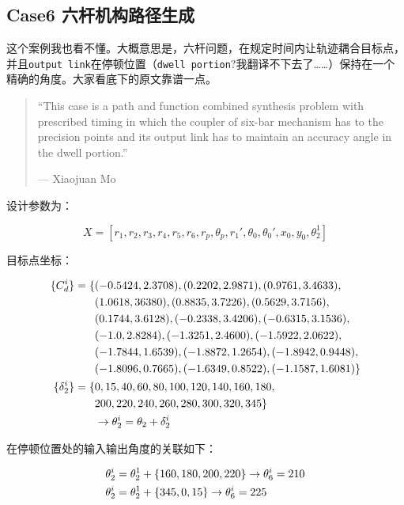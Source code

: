 \documentclass[]{ctexbook}
\theoremstyle{definition}
\theoremstyle{definition}
\theoremstyle{definition}
\theoremstyle{remark}
\begin{document}
\subsection{Case6 六杆机构路径生成}\label{case6-}

这个案例我也看不懂。大概意思是，六杆问题，在规定时间内让轨迹耦合目标点，并且\texttt{output\ link}在停顿位置（\texttt{dwell\ portion}?我翻译不下去了\ldots{}\ldots{}）保持在一个精确的角度。大家看底下的原文靠谱一点。

\begin{quote}
``This case is a path and function combined synthesis problem with
prescribed timing in which the coupler of six-bar mechanism has to the
precision points and its output link has to maintain an accuracy angle
in the dwell portion.''

\begin{flushright}--- Xiaojuan Mo\end{flushright}
\end{quote}

设计参数为：

\[
X = [r_1,r_2,r_3,r_4,r_5,r_6,r_p,\theta_p,r_1',\theta_0,\theta_0',x_0,y_0,\theta_2^1] 
\]

目标点坐标：

\begin{align}
\{C_d^i\} = \{&(-0.5424,2.3708),(0.2202,2.9871),(0.9761,3.4633), \notag \\
&(1.0618,36380),(0.8835,3.7226),(0.5629,3.7156),\notag \\
&(0.1744,3.6128),(-0.2338,3.4206),(-0.6315,3.1536), \notag \\
&(-1.0,2.8284),(-1.3251,2.4600),(-1.5922,2.0622), \notag \\
&(-1.7844,1.6539),(-1.8872,1.2654),(-1.8942,0.9448), \notag \\
&(-1.8096,0.7665),(-1.6349,0.8522),(-1.1587,1.6081)\} \notag \\
\{\delta_2^i\} = \{&0,15,40,60,80,100,120,140,160,180,\notag \\
& 200, 220,240,260,280,300,320,345\} \notag \\
& \rightarrow \theta_2^i = \theta_2 + \delta_2^i \notag \\
\end{align}

在停顿位置处的输入输出角度的关联如下：

\begin{align}
&\theta_2^i = \theta_2^1+\{160,180,200,220\}\rightarrow \theta_6^i=210 \notag \\
&\theta_2^i=\theta_2^1+\{345,0,15\} \rightarrow \theta_6^i = 225 \notag \\
\end{align}
\end{document}
